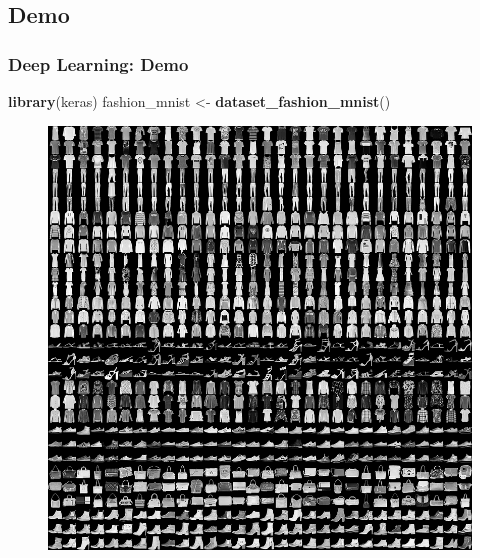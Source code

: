 \documentclass[
  shownotes,
  xcolor={svgnames},
  hyperref={colorlinks,citecolor=DarkBlue,linkcolor=DarkRed,urlcolor=DarkBlue}
  , aspectratio=169]{beamer}
\newenvironment{Shaded}{\begin{snugshade}}{\end{snugshade}}
\newcommand{\KeywordTok}[1]{\textcolor[rgb]{0.13,0.29,0.53}{\textbf{#1}}}
\newcommand{\NormalTok}[1]{#1}
\newcommand{\StringTok}[1]{\textcolor[rgb]{0.31,0.60,0.02}{#1}}
\begin{document}
\subsection{Demo}
\begin{frame}[fragile]
\frametitle{Deep Learning: Demo}





\begin{Shaded}
\begin{Highlighting}[]
\KeywordTok{library}\NormalTok{(keras)}
\NormalTok{fashion\_mnist \textless{}{-}}\StringTok{ }\KeywordTok{dataset\_fashion\_mnist}\NormalTok{()}
\end{Highlighting}
\end{Shaded}

  \begin{figure}[H] \centering
            \captionsetup{justification=centering}
              \includegraphics[scale=0.4]{figures/fashion-mnist-sprite}
              
 \end{figure}
\end{frame}
\end{document}
